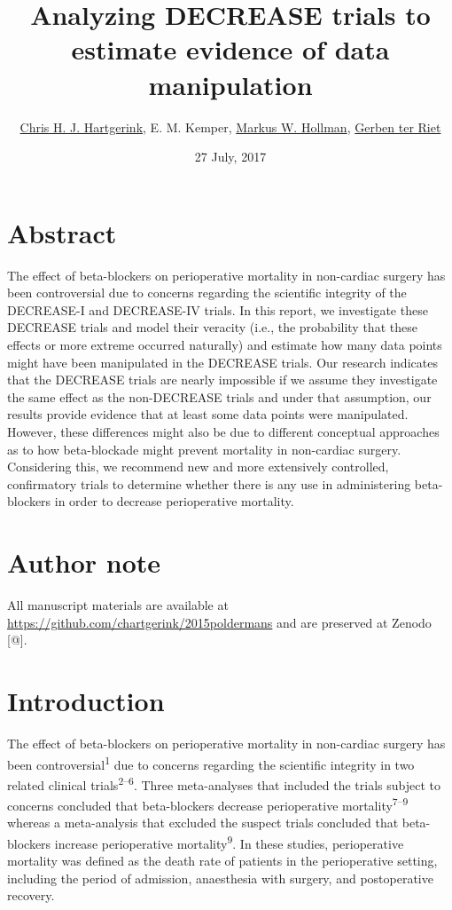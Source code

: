 \documentclass[]{article}
\title{Analyzing DECREASE trials to estimate evidence of data manipulation}
\author{\href{https://orcid.org/}{Chris H. J. Hartgerink}, E. M. Kemper,
\href{https://orcid.org/0000-0001-8248-0244}{Markus W. Hollman},
\href{https://orcid.org/0000-0002-2231-7637}{Gerben ter Riet}}
\date{27 July, 2017}
\begin{document}
\maketitle

\section{Abstract}\label{abstract}

The effect of beta-blockers on perioperative mortality in non-cardiac
surgery has been controversial due to concerns regarding the scientific
integrity of the DECREASE-I and DECREASE-IV trials. In this report, we
investigate these DECREASE trials and model their veracity (i.e., the
probability that these effects or more extreme occurred naturally) and
estimate how many data points might have been manipulated in the
DECREASE trials. Our research indicates that the DECREASE trials are
nearly impossible if we assume they investigate the same effect as the
non-DECREASE trials and under that assumption, our results provide
evidence that at least some data points were manipulated. However, these
differences might also be due to different conceptual approaches as to
how beta-blockade might prevent mortality in non-cardiac surgery.
Considering this, we recommend new and more extensively controlled,
confirmatory trials to determine whether there is any use in
administering beta-blockers in order to decrease perioperative
mortality.

\section{Author note}\label{author-note}

All manuscript materials are available at
\url{https://github.com/chartgerink/2015poldermans} and are preserved at
Zenodo {[}@{]}.

\section{Introduction}\label{introduction}

The effect of beta-blockers on perioperative mortality in non-cardiac
surgery has been controversial\textsuperscript{1} due to concerns
regarding the scientific integrity in two related clinical
trials\textsuperscript{2--6}. Three meta-analyses that included the
trials subject to concerns concluded that beta-blockers decrease
perioperative mortality\textsuperscript{7--9} whereas a meta-analysis
that excluded the suspect trials concluded that beta-blockers increase
perioperative mortality\textsuperscript{9}. In these studies,
perioperative mortality was defined as the death rate of patients in the
perioperative setting, including the period of admission, anaesthesia
with surgery, and postoperative recovery.
\end{document}
